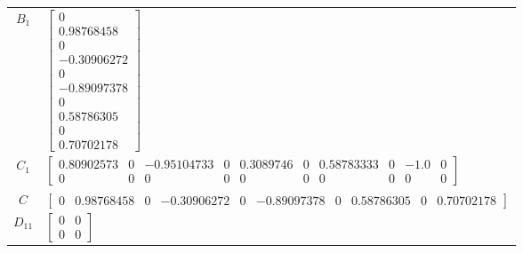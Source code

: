 \begin{tabular}{cl}
 $B_{1}$  & $\left[\begin{matrix}0\\0.98768458\\0\\-0.30906272\\0\\-0.89097378\\0\\0.58786305\\0\\0.70702178\end{matrix}\right]$                                                                                                                                                                                                                                                                                                                                                                                                                                              \\
 $C_{1}$  & $\left[\begin{matrix}0.80902573 & 0 & -0.95104733 & 0 & 0.3089746 & 0 & 0.58783333 & 0 & -1.0 & 0\\0 & 0 & 0 & 0 & 0 & 0 & 0 & 0 & 0 & 0\end{matrix}\right]$                                                                                                                                                                                                                                                                                                                                                                                                      \\
   $C$    & $\left[\begin{matrix}0 & 0.98768458 & 0 & -0.30906272 & 0 & -0.89097378 & 0 & 0.58786305 & 0 & 0.70702178\end{matrix}\right]$                                                                                                                                                                                                                                                                                                                                                                                                                                     \\
 $D_{11}$ & $\left[\begin{matrix}0 & 0\\0 & 0\end{matrix}\right]$                                                                                                                                                                                                                                                                                                                                                                                                                                                                                                             \\

\end{tabular}
